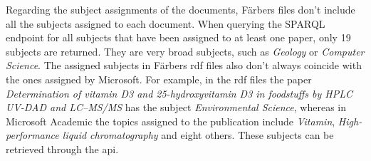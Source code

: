 Regarding the subject assignments of the documents, Färbers files don't include all the subjects assigned to each document. When querying the SPARQL endpoint for all subjects that have been assigned to at least one paper, only 19 subjects are returned. They are very broad subjects, such as \textit{Geology} or \textit{Computer Science}. The assigned subjects in Färbers \acrshort{rdf} files also don't always coincide with the ones assigned by Microsoft. For example, in the \acrshort{rdf} files the paper \textit{Determination of vitamin D3 and 25-hydroxyvitamin D3 in foodstuffs by HPLC UV-DAD and LC–MS/MS} has the subject \textit{Environmental Science}, whereas in Microsoft Academic the topics assigned to the publication include \textit{Vitamin}, \textit{High-performance liquid chromatography} and eight others. These subjects can be retrieved through the \acrshort{api}.
